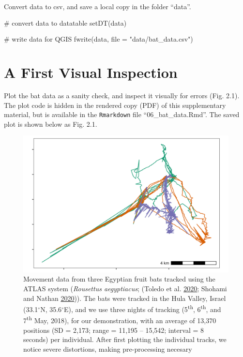 \documentclass[]{scrreprt}
\newenvironment{Shaded}{}{}
\newcommand{\CommentTok}[1]{\textcolor[rgb]{0.00,0.50,0.00}{#1}}
\newcommand{\DataTypeTok}[1]{#1}
\newcommand{\KeywordTok}[1]{\textcolor[rgb]{0.00,0.00,1.00}{#1}}
\newcommand{\NormalTok}[1]{#1}
\newcommand{\StringTok}[1]{\textcolor[rgb]{0.00,0.50,0.50}{#1}}
\begin{document}
Convert data to csv, and save a local copy in the folder ``data''.

\begin{Shaded}
\begin{Highlighting}[]
\CommentTok{# convert data to datatable}
\KeywordTok{setDT}\NormalTok{(data)}

\CommentTok{# write data for QGIS}
\KeywordTok{fwrite}\NormalTok{(data, }\DataTypeTok{file =} \StringTok{"data/bat_data.csv"}\NormalTok{)}
\end{Highlighting}
\end{Shaded}

\hypertarget{a-first-visual-inspection}{%
\section{A First Visual Inspection}\label{a-first-visual-inspection}}

Plot the bat data as a sanity check, and inspect it visually for errors (Fig. 2.1).
The plot code is hidden in the rendered copy (PDF) of this supplementary material, but is available in the \texttt{Rmarkdown} file ``06\_bat\_data.Rmd''.
The saved plot is shown below as Fig. 2.1.

\begin{figure}
\centering
\includegraphics{figures/fig_bat_raw.png}
\caption{Movement data from three Egyptian fruit bats tracked using the ATLAS system (\emph{Rousettus aegyptiacus}; (Toledo et al. \protect\hyperlink{ref-toledo2020}{2020}; Shohami and Nathan \protect\hyperlink{ref-shohami2020}{2020})).
The bats were tracked in the Hula Valley, Israel (33.1\(^{\circ}\)N, 35.6\(^{\circ}\)E), and we use three nights of tracking (5\textsuperscript{th}, 6\textsuperscript{th}, and 7\textsuperscript{th} May, 2018), for our demonstration, with an average of 13,370 positions (SD = 2,173; range = 11,195 -- 15,542; interval = 8 seconds) per individual.
After first plotting the individual tracks, we notice severe distortions, making pre-processing necesary}
\end{figure}
\end{document}
